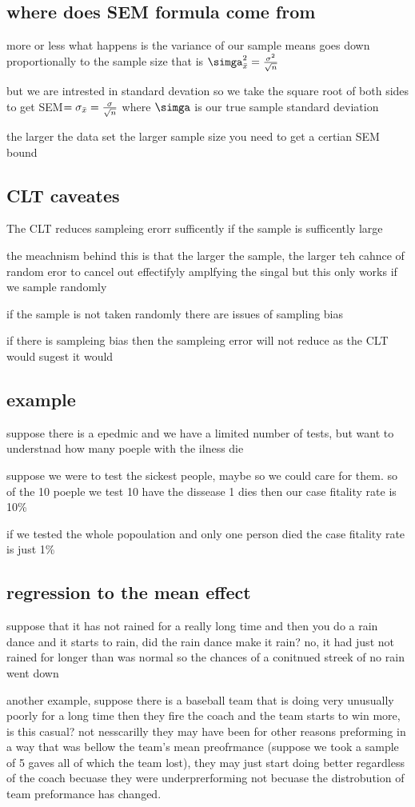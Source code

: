 \documentclass{article}
\begin{document}
\subsection{where does SEM formula come from}
\item more or less what happens is the variance of our sample means goes down proportionally to the sample size that is $\simga_{\Bar{x}}^2=\frac{\sigma^2}{\sqrt{n}}$
\item but we are intrested in standard devation so we take the square root of both sides to get 
SEM$=\sigma_{\Bar{x}}=\frac{\sigma}{\sqrt{n}}$ where $\simga$ is our true sample standard deviation 
\item the larger the data set the larger sample size you need to get a certian SEM bound 
\subsection{CLT caveates}
\item The CLT reduces sampleing erorr sufficently if the sample is sufficently large
\item the meachnism behind this is that the larger the sample, the larger teh cahnce of random eror to cancel out effectifyly amplfying the singal 
\itme but this only works if we sample randomly 
\item if the sample is not taken randomly there are issues of sampling bias 
\item if there is sampleing bias then the sampleing error will not reduce as the CLT would sugest it would 
\subsection{example}
\item suppose there is a epedmic and we have a limited number of tests, but want to understnad how many poeple with the ilness die 
\item suppose we were to test the sickest people, maybe so we could care for them. so of the 10 poeple we test 10 have the dissease 1 dies then our case fitality rate is 10\%
\item if we tested the whole popoulation and only one person died the case fitality rate is just 1\%
\subsection{regression to the mean effect}
\item suppose that it has not rained for a really long time and then you do a rain dance and it starts to rain, did the rain dance make it rain? no, it had just not rained for longer than was normal so the chances of a conitnued streek of no rain went down 
\item another example, suppose there is a baseball team that is doing very unusually poorly for a long time then they fire the coach and the team starts to win more, is this casual? not nesscarilly they may have been for other reasons preforming in a way that was bellow the team's mean preofrmance (suppose we took a sample of 5 gaves all of which the team lost), they may just start doing better regardless of the coach becuase they were underprerforming not becuase the distrobution of team preformance has changed. 
\end{document}
